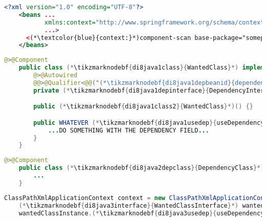 \begin{lstlisting}[language=XML, title={Configuration XML}]
    <?xml version="1.0" encoding="UTF-8"?>
    <beans ...
           xmlns:context="http://www.springframework.org/schema/context"
           ...>
      <(*\textcolor{blue}{context:}*)component-scan base-package="somepackage.subpackage"/>
    </beans>
\end{lstlisting}
\begin{lstlisting}[language=Java, title={Wanted class with the zero--parameter constructor}]
    @>@Component
    public class (*\tikzmarknodebf{di8java1class}{WantedClass}*) implements (*\tikzmarknodebf{di8java1interface}{WantedClassInterface}*) {
        @>@Autowired
        @@>@Qualifier<@@("(*\tikzmarknodebf{di8java1depbeanid}{dependencyClass}[ForestGreen]*)")
        private (*\tikzmarknodebf{di8java1depinterface}{DependencyInterface}*) dependencyField;

        public (*\tikzmarknodebf{di8java1class2}{WantedClass}*)() {}

        public WHATEVER (*\tikzmarknodebf{di8java1usedep}{useDependency}*)() {
            ...DO SOMETHING WITH THE DEPENDENCY FIELD...
        }
    }
\end{lstlisting}
\begin{lstlisting}[language=Java, title={Dependency class}]
    @>@Component
    public class (*\tikzmarknodebf{di8java2depclass}{DependencyClass}*) implements (*\tikzmarknodebf{di8java2depinterface}{DependencyInterface}*) {
        ...
    }
\end{lstlisting}
\begin{lstlisting}[language=Java, title={Usage}]
    ClassPathXmlApplicationContext context = new ClassPathXmlApplicationContext("configurationFile.xml");
    (*\tikzmarknodebf{di8java3interface}{WantedClassInterface}*) wantedClassInstance = context.getBean("(*\tikzmarknodebf{di8java3beanid}{wantedClass}[ForestGreen]*)", (*\tikzmarknodebf{di8java3interface2}{WantedClassInterface}*).class);
    wantedClassInstance.(*\tikzmarknodebf{di8java3usedep}{useDependency}*)();
\end{lstlisting}
\newpage

